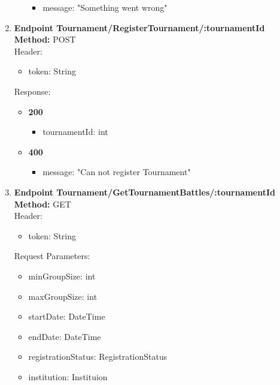 \begin{enumerate}
\begin{itemize}
        \begin{itemize}
            \item message: "Something went wrong"
        \end{itemize}
    \end{itemize}
    \item \textbf{Endpoint Tournament/RegisterTournament/:tournamentId} \\
    \textbf{Method:} POST \\
    Header:\\
    \begin{itemize}
        \item token: String
    \end{itemize}
    Response:\\
    \begin{itemize}
        \item \textbf{200} \\
        \begin{itemize}
            \item tournamentId: int
        \end{itemize}
        \item \textbf{400} \\
        \begin{itemize}
            \item message: "Can not register Tournament"
        \end{itemize}
    \end{itemize}
    \item \textbf{Endpoint Tournament/GetTournamentBattles/:tournamentId} \\
    \textbf{Method:} GET \\
    Header:\\
    \begin{itemize}
        \item token: String
    \end{itemize}
    Request Parameters:\\
    \begin{itemize}
        \item minGroupSize: int
        \item maxGroupSize: int
        \item startDate: DateTime
        \item endDate: DateTime
        \item registrationStatus: RegistrationStatus
        \item institution: Instituion

\end{itemize}
\end{enumerate}
